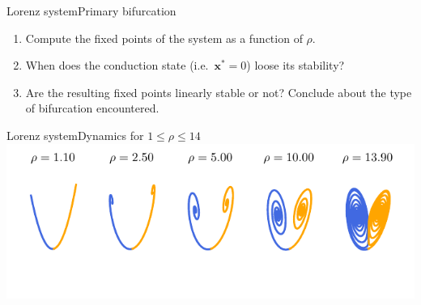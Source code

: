 \documentclass[usenames,dvipsnames,svgnames,10pt,aspectratio=169]{beamer}
\begin{document}
\begin{frame}[t, c]{Lorenz system}{Primary bifurcation}
	\begin{enumerate}
		\item Compute the fixed points of the system as a function of $\rho$.
		\item When does the conduction state (i.e.\ $\bm{x}^* = 0$) loose its stability?
		\item Are the resulting fixed points linearly stable or not? Conclude about the type of bifurcation encountered.
	\end{enumerate}

	\vspace{1cm}
\end{frame}

\begin{frame}[t, c]{Lorenz system}{Dynamics for $1 \leq \rho \leq 14$}
	\centering
	\includegraphics[width=.8\textwidth]{primary_bifurcation_phase_plots}

	\vspace{1cm}
\end{frame}
\end{document}
